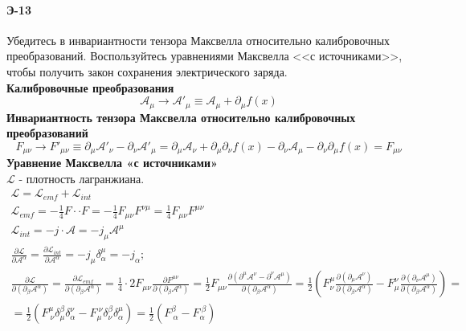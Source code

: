 \documentclass[__main__.tex]{subfiles}
\begin{document}
\paragraph{Э-13}
Убедитесь в инвариантности тензора Максвелла относительно калибровочных преобразований. Воспользуйтесь уравнениями Максвелла <<с источниками>>, чтобы получить закон сохранения электрического заряда.\\

\textbf{Калибровочные преобразования}\\
$$\mathcal A_\mu \longrightarrow \mathcal A'_\mu \equiv \mathcal A_\mu +\partial_\mu f(x)$$
\textbf{Инвариантность тензора Максвелла относительно калибровочных преобразований}\\
$$F_{\mu\nu} \longrightarrow F'_{\mu\nu} \equiv \partial_\mu \mathcal A'_\nu - \partial_\nu \mathcal A'_\mu = \partial_\mu \mathcal A_\nu + \partial_\mu \partial_\nu f(x) - \partial_\nu \mathcal A_\mu - \partial_\nu\partial_\mu f(x) = F_{\mu\nu}$$
\textbf{Уравнение Максвелла «с источниками»}\\
$\mathcal L$ - плотность лагранжиана. 
\begin{gather*}
\mathcal L = \mathcal L_{emf} + \mathcal L_{int}\\
\mathcal L_{emf} = -\frac{1}{4} F \cdot\cdot F = -\frac{1}{4}F_{\mu \nu}F^{\nu\mu} = \frac{1}{4}F_{\mu\nu}F^{\mu\nu}\\
\mathcal L_{int} = -j \cdot \mathcal A = -j_\mu \mathcal A^\mu\\
\frac{\partial\mathcal L}{\partial \mathcal A^\alpha} = \frac{\partial\mathcal L_{int}}{\partial \mathcal A^\alpha} = -j_\mu \delta_\alpha^\mu = -j_\alpha;\\
\frac{\partial \mathcal L}{\partial(\partial_\beta \mathcal A^\alpha)} = \frac{\partial \mathcal L_{emf}}{\partial(\partial_\beta\mathcal A^\alpha)} = \frac{1}{4} \cdot 2F_{\mu\nu}\frac{\partial F^{\mu \nu}}{\partial(\partial_\beta \mathcal A^\alpha)} = \frac{1}{2}F_{\mu\nu}\frac{\partial(\partial^\mu\mathcal A^\nu - \partial^\nu \mathcal A^\mu)}{\partial(\partial_\beta \mathcal A^\alpha)} = \frac{1}{2}\left(F^\mu_\nu\frac{\partial(\partial_\mu\mathcal A^\nu)}{\partial(\partial_\beta \mathcal A^\alpha)} - F^\nu_\mu\frac{\partial(\partial_\nu\mathcal A^\mu)}{\partial(\partial_\beta \mathcal A^\alpha)}\right) =\\ =  \frac{1}{2} \left( F^\mu_{\ \nu} \delta^\beta_\mu \delta^\nu_\alpha - F^{\ \nu}_\mu \delta^\beta_\nu \delta^\mu_\alpha \right) = \frac{1}{2} \left(F^\beta_{\ \alpha} - F^{\ \beta}_\alpha\right)
\end{gather*}
\end{document}
